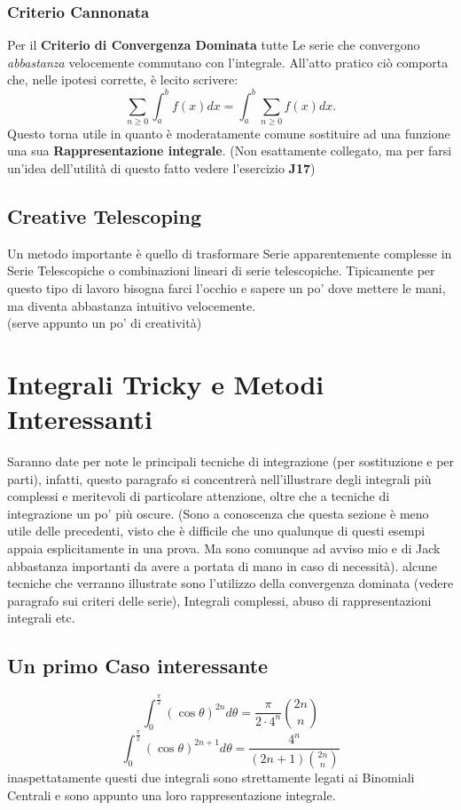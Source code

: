 \documentclass[a4paper,twoside]{article}
\theoremstyle{definition}
\numberwithin{theorem}{section}
\begin{document}
\subsubsection{Criterio Cannonata}

Per il \textbf{Criterio di Convergenza Dominata} tutte Le serie che convergono \emph{abbastanza} velocemente commutano con l'integrale. All'atto pratico ciò comporta che, nelle ipotesi corrette, è lecito scrivere:
$$\sum_{n\geq 0}^{}\int_{a}^{b}f(x)dx =\int_{a}^{b}\sum_{n\geq 0}^{}f(x) dx.$$ 
Questo torna utile in quanto è moderatamente comune sostituire ad una funzione una sua \textbf{Rappresentazione integrale}.
(Non esattamente collegato, ma per farsi un'idea dell'utilità di questo fatto vedere l'esercizio \textbf{J17})
\subsection{Creative Telescoping}
Un metodo importante è quello di trasformare Serie apparentemente complesse in Serie Telescopiche o combinazioni lineari di serie telescopiche.
Tipicamente per questo tipo di lavoro bisogna farci l'occhio e sapere un po' dove mettere le mani, ma diventa abbastanza intuitivo velocemente.\\ (serve appunto un po' di creatività)\\

\section{Integrali Tricky e Metodi Interessanti}
Saranno date per note le principali tecniche di integrazione (per sostituzione e per parti), infatti, questo paragrafo si concentrerà nell'illustrare degli integrali più complessi e meritevoli di particolare attenzione, oltre che a tecniche di integrazione un po' più oscure. (Sono a conoscenza che questa sezione è meno utile delle precedenti, visto che è difficile che uno qualunque di questi esempi appaia esplicitamente in una prova. Ma sono comunque ad avviso mio e di Jack abbastanza importanti da avere a portata di mano in caso di necessità). alcune tecniche che verranno illustrate sono l'utilizzo della convergenza dominata (vedere paragrafo sui criteri delle serie), Integrali complessi, abuso di rappresentazioni integrali etc.
\subsection{Un primo Caso interessante}
$$\int_{0}^{\frac{\pi}{2}}(\cos \theta)^{2n}d\theta=\frac{\pi}{2\cdot4^n}\binom{2n}{n}$$
$$\int_{0}^{\frac{\pi}{2}}(\cos \theta)^{2n+1}d\theta= \frac{4^n}{(2n+1)\binom{2n}{n}}$$
inaspettatamente questi due integrali sono strettamente legati ai Binomiali Centrali e sono appunto una loro rappresentazione integrale.
\end{document}
